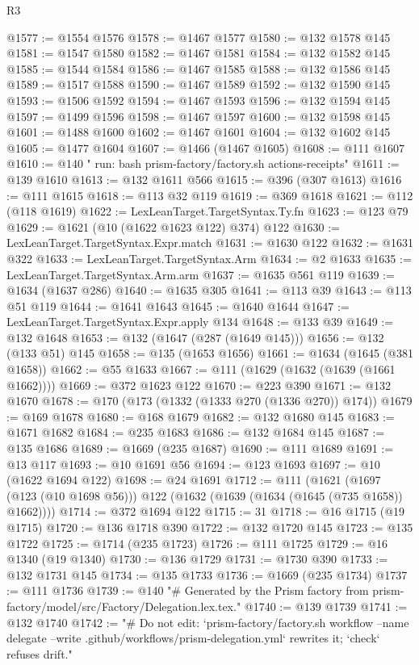 \begin{lexlean}{R3}
\begin{coremodule}
@1577 := @1554 @1576
@1578 := @1467 @1577
@1580 := @132 @1578 @145
@1581 := @1547 @1580
@1582 := @1467 @1581
@1584 := @132 @1582 @145
@1585 := @1544 @1584
@1586 := @1467 @1585
@1588 := @132 @1586 @145
@1589 := @1517 @1588
@1590 := @1467 @1589
@1592 := @132 @1590 @145
@1593 := @1506 @1592
@1594 := @1467 @1593
@1596 := @132 @1594 @145
@1597 := @1499 @1596
@1598 := @1467 @1597
@1600 := @132 @1598 @145
@1601 := @1488 @1600
@1602 := @1467 @1601
@1604 := @132 @1602 @145
@1605 := @1477 @1604
@1607 := @1466 (@1467 @1605)
@1608 := @111 @1607
@1610 := @140 "        run: bash prism-factory/factory.sh actions-receipts"
@1611 := @139 @1610
@1613 := @132 @1611 @566
@1615 := @396 (@307 @1613)
@1616 := @111 @1615
@1618 := @113 @32 @119
@1619 := @369 @1618
@1621 := @112 (@118 @1619)
@1622 := LexLeanTarget.TargetSyntax.Ty.fn
@1623 := @123 @79
@1629 := @1621 (@10 (@1622 @1623 @122) @374) @122
@1630 := LexLeanTarget.TargetSyntax.Expr.match
@1631 := @1630 @122
@1632 := @1631 @322
@1633 := LexLeanTarget.TargetSyntax.Arm
@1634 := @2 @1633
@1635 := LexLeanTarget.TargetSyntax.Arm.arm
@1637 := @1635 @561 @119
@1639 := @1634 (@1637 @286)
@1640 := @1635 @305
@1641 := @113 @39
@1643 := @113 @51 @119
@1644 := @1641 @1643
@1645 := @1640 @1644
@1647 := LexLeanTarget.TargetSyntax.Expr.apply @134
@1648 := @133 @39
@1649 := @132 @1648
@1653 := @132 (@1647 (@287 (@1649 @145)))
@1656 := @132 (@133 @51) @145
@1658 := @135 (@1653 @1656)
@1661 := @1634 (@1645 (@381 @1658))
@1662 := @55 @1633
@1667 := @111 (@1629 (@1632 (@1639 (@1661 @1662))))
@1669 := @372 @1623 @122
@1670 := @223 @390
@1671 := @132 @1670
@1678 := @170 (@173 (@1332 (@1333 @270 (@1336 @270)) @174))
@1679 := @169 @1678
@1680 := @168 @1679
@1682 := @132 @1680 @145
@1683 := @1671 @1682
@1684 := @235 @1683
@1686 := @132 @1684 @145
@1687 := @135 @1686
@1689 := @1669 (@235 @1687)
@1690 := @111 @1689
@1691 := @13 @117
@1693 := @10 @1691 @56
@1694 := @123 @1693
@1697 := @10 (@1622 @1694 @122)
@1698 := @24 @1691
@1712 := @111
    (@1621 (@1697 (@123 (@10 @1698 @56))) @122 (@1632 (@1639 (@1634 (@1645 (@735 @1658)) @1662))))
@1714 := @372 @1694 @122
@1715 := 31
@1718 := @16 @1715 (@19 @1715)
@1720 := @136 @1718 @390
@1722 := @132 @1720 @145
@1723 := @135 @1722
@1725 := @1714 (@235 @1723)
@1726 := @111 @1725
@1729 := @16 @1340 (@19 @1340)
@1730 := @136 @1729
@1731 := @1730 @390
@1733 := @132 @1731 @145
@1734 := @135 @1733
@1736 := @1669 (@235 @1734)
@1737 := @111 @1736
@1739 := @140
    "# Generated by the Prism factory from prism-factory/model/src/Factory/Delegation.lex.tex."
@1740 := @139 @1739
@1741 := @132 @1740
@1742 := "# Do not edit: `prism-factory/factory.sh workflow --name delegate --write .github/workflows/prism-delegation.yml` rewrites it; `check` refuses drift."

\end{coremodule}
\end{lexlean}
